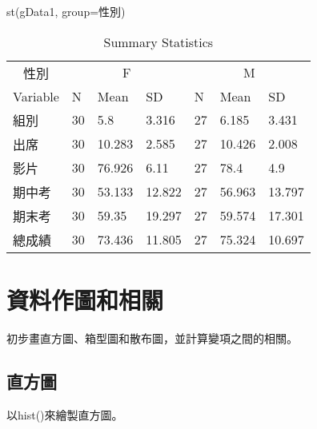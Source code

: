 \documentclass[
]{book}
\newenvironment{Shaded}{\begin{snugshade}}{\end{snugshade}}
\newcommand{\AttributeTok}[1]{\textcolor[rgb]{0.77,0.63,0.00}{#1}}
\newcommand{\FunctionTok}[1]{\textcolor[rgb]{0.00,0.00,0.00}{#1}}
\newcommand{\NormalTok}[1]{#1}
\newcommand{\SpecialCharTok}[1]{\textcolor[rgb]{0.00,0.00,0.00}{#1}}
\newcommand{\StringTok}[1]{\textcolor[rgb]{0.31,0.60,0.02}{#1}}
\begin{document}
\begin{Shaded}
\begin{Highlighting}[]
\FunctionTok{st}\NormalTok{(gData1, }\AttributeTok{group=}\StringTok{\textquotesingle{}性別\textquotesingle{}}\NormalTok{)}
\end{Highlighting}
\end{Shaded}

\begin{table}

\caption{\label{tab:unnamed-chunk-37}Summary Statistics}
\centering
\begin{tabular}[t]{lllllll}
\toprule
\multicolumn{1}{c}{性別} & \multicolumn{3}{c}{F} & \multicolumn{3}{c}{M} \\
\cmidrule(l{3pt}r{3pt}){1-1} \cmidrule(l{3pt}r{3pt}){2-4} \cmidrule(l{3pt}r{3pt}){5-7}
Variable & N & Mean & SD & N & Mean & SD\\
\midrule
組別 & 30 & 5.8 & 3.316 & 27 & 6.185 & 3.431\\
出席 & 30 & 10.283 & 2.585 & 27 & 10.426 & 2.008\\
影片 & 30 & 76.926 & 6.11 & 27 & 78.4 & 4.9\\
期中考 & 30 & 53.133 & 12.822 & 27 & 56.963 & 13.797\\
期末考 & 30 & 59.35 & 19.297 & 27 & 59.574 & 17.301\\
\addlinespace
總成績 & 30 & 73.436 & 11.805 & 27 & 75.324 & 10.697\\
\bottomrule
\end{tabular}
\end{table}

\hypertarget{ux8cc7ux6599ux4f5cux5716ux548cux76f8ux95dc}{%
\section{資料作圖和相關}\label{ux8cc7ux6599ux4f5cux5716ux548cux76f8ux95dc}}

初步畫直方圖、箱型圖和散布圖，並計算變項之間的相關。

\hypertarget{ux76f4ux65b9ux5716}{%
\subsection{直方圖}\label{ux76f4ux65b9ux5716}}

以hist()來繪製直方圖。

\begin{Shaded}
\end{Shaded}
\end{document}
